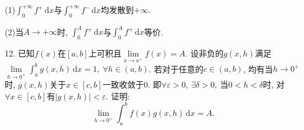 \documentclass[12pt, a4paper, twoside]{ctexart}%
\newcommand{\rmd}{\mathrm{d}} %
\begin{document}
	\hspace{1.7em}(1)$\int_0^{+\infty}f^+\,\rmd x$与$\int_0^{+\infty}f^-\,\rmd x$均发散到$+\infty$.\par 
	\hspace{1.7em}(2)当$A\rightarrow+\infty$时, $\int_0^{A}f^+\,\rmd x$与$\int_0^{A}f^+\,\rmd x$等价.\par
	12. 已知$f(x)$在$[a,b]$上可积且$\lim\limits_{x\rightarrow a^+}f(x)=A$. 设非负的$g(x,h)$满足$\lim\limits_{h\rightarrow 0^+}\int_a^b g(x,h)\,\rmd x=1,\ \forall h\in(a,b)$. 若对于任意的$c\in(a,b)$, 均有当$h\rightarrow 0^+$时, $g(x,h)$关于$x\in[c,b]$一致收敛于0. 即$\forall \varepsilon>0,\ \exists\delta>0,\ $当$0<h<\delta$时, 对$\forall x\in[c,b]$有$|g(x,h)|<\varepsilon$. 证明:\[
	\lim\limits_{h\rightarrow0 ^+}\int_a^bf(x)g(x,h)\,\rmd x=A.\]\par 
	
	\clearpage
\end{document}
